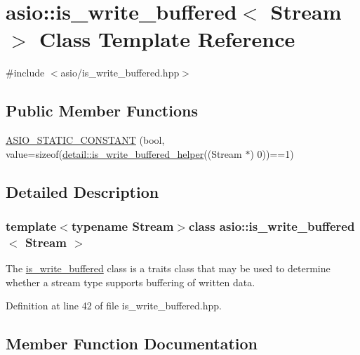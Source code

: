 \hypertarget{classasio_1_1is__write__buffered}{}\section{asio\+:\+:is\+\_\+write\+\_\+buffered$<$ Stream $>$ Class Template Reference}
\label{classasio_1_1is__write__buffered}


{\ttfamily \#include $<$asio/is\+\_\+write\+\_\+buffered.\+hpp$>$}

\subsection*{Public Member Functions}
\begin{DoxyCompactItemize}
\item 
\hyperlink{classasio_1_1is__write__buffered_a696f85ff1a8dd1eb4f40e25fa266ee4c}{A\+S\+I\+O\+\_\+\+S\+T\+A\+T\+I\+C\+\_\+\+C\+O\+N\+S\+T\+A\+N\+T} (bool, value=sizeof(\hyperlink{namespaceasio_1_1detail_a92c09d4f26720d51674e29602933009c}{detail\+::is\+\_\+write\+\_\+buffered\+\_\+helper}((Stream $\ast$) 0))==1)
\end{DoxyCompactItemize}


\subsection{Detailed Description}
\subsubsection*{template$<$typename Stream$>$class asio\+::is\+\_\+write\+\_\+buffered$<$ Stream $>$}

The \hyperlink{classasio_1_1is__write__buffered}{is\+\_\+write\+\_\+buffered} class is a traits class that may be used to determine whether a stream type supports buffering of written data. 

Definition at line 42 of file is\+\_\+write\+\_\+buffered.\+hpp.



\subsection{Member Function Documentation}
\hypertarget{classasio_1_1is__write__buffered_a696f85ff1a8dd1eb4f40e25fa266ee4c}{}
